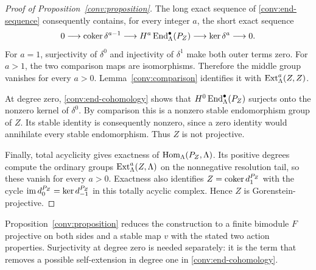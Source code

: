 \begin{proof}[Proof of Proposition~\ref{conv:proposition}]
The long exact sequence of \eqref{conv:end-sequence} consequently
contains, for every integer $a$, the short exact sequence
\begin{equation}\label{conv:end-cohomology}
 0\longrightarrow\operatorname{coker}\delta^{a-1}
 \longrightarrow H^a\operatorname{End}^\bullet_\Lambda(P_Z)
 \longrightarrow\ker\delta^a\longrightarrow0.
\end{equation}
For $a=1$, surjectivity of $\delta^0$ and injectivity of $\delta^1$
make both outer terms zero.  For $a>1$, the two comparison maps are
isomorphisms.  Therefore the middle group vanishes for every $a>0$.
Lemma~\ref{conv:comparison} identifies it with
$\operatorname{Ext}^a_\Lambda(Z,Z)$.

At degree zero, \eqref{conv:end-cohomology} shows that
$H^0\operatorname{End}^\bullet_\Lambda(P_Z)$ surjects onto the nonzero kernel of
$\delta^0$.  By comparison this is a nonzero stable endomorphism
group of $Z$.  Its stable identity is consequently nonzero, since a
zero identity would annihilate every stable endomorphism.  Thus $Z$
is not projective.

Finally, total acyclicity gives exactness of
$\operatorname{Hom}_\Lambda(P_Z,\Lambda)$.  Its positive degrees compute the
ordinary groups $\operatorname{Ext}^a_\Lambda(Z,\Lambda)$ on the nonnegative
resolution tail, so these vanish for every $a>0$.  Exactness also
identifies $Z=\operatorname{coker} d_1^{P_Z}$ with the cycle
$\operatorname{im} d_0^{P_Z}=\ker d_{-1}^{P_Z}$ in this totally acyclic complex.
Hence $Z$ is Gorenstein-projective.
\end{proof}

Proposition~\ref{conv:proposition} reduces the construction to a finite
bimodule $F$ projective on both sides and a stable map $v$ with the stated two
action properties.  Surjectivity at degree zero is needed separately:
it is the term that removes a possible self-extension in degree one
in \eqref{conv:end-cohomology}.
